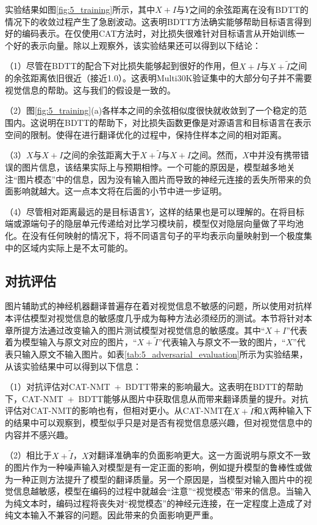 实验结果如图\ref{fig:5_training}所示，其中$X+I$与$Y$之间的余弦距离在没有BDTT的情况下的收敛过程产生了急剧波动。这表明BDTT方法确实能够帮助目标语言得到好的编码表示。在仅使用CAT方法时，对比损失很难针对目标语言从开始训练一个好的表示向量。除以上观察外，该实验结果还可以得到以下结论：

（1）尽管在BDTT的配合下对比损失能够起到很好的作用，但$X+I$与$X+\tilde{I}$之间的余弦距离依旧很近（接近1.0）。这表明Multi30K验证集中的大部分句子并不需要视觉信息的帮助。这与我们的假设是一致的。

（2）图\ref{fig:5_training}(a)各样本之间的余弦相似度很快就收敛到了一个稳定的范围内。这说明在BDTT的帮助下，对比损失函数更像是对源语言和目标语言在表示空间的限制。使得在进行翻译优化的过程中，保持住样本之间的相对距离。

（3）$X$与$X+I$之间的余弦距离大于$X+\tilde{I}$与$X+I$之间。然而，$X$中并没有携带错误的图片信息，该结果实际上与预期相悖。一个可能的原因是，模型越多地关注“图片模态”中的信息，因为没有输入图片而导致的神经元连接的丢失所带来的负面影响就越大。这一点本文将在后面的小节中进一步证明。

（4）尽管相对距离最远的是目标语言$Y$，这样的结果也是可以理解的。在将目标端或源端句子的隐层单元传递给对比学习模块前，模型仅对隐层向量做了平均池化。在没有任何映射的情况下，将不同语言句子的平均表示向量映射到一个极度集中的区域内实际上是不太可能的。

\subsection{对抗评估}
\label{sec:5_adversarial_evaluation}

图片辅助式的神经机器翻译普遍存在着对视觉信息不敏感的问题，所以使用对抗样本评估模型对视觉信息的敏感度几乎成为每种方法必须经历的测试。本节将针对本章所提方法通过改变输入的图片测试模型对视觉信息的敏感度。其中“$X+I$”代表着为模型输入与原文对应的图片，“$X+\tilde{I}$”代表输入与原文不一致的图片，“$X$”代表只输入原文不输入图片。如表\ref{tab:5_adversarial_evaluation}所示为实验结果，从该实验结果中可以得到以下信息：

（1）对抗评估对CAT-NMT~+~BDTT带来的影响最大。这表明在BDTT的帮助下，CAT-NMT~+~BDTT能够从图片中获取信息从而带来翻译质量的提升。对抗评估对CAT-NMT的影响也有，但相对更小。从CAT-NMT在$X+\tilde{I}$和$X$两种输入下的结果中可以观察到，模型似乎只是对是否有视觉信息感兴趣，但对视觉信息中的内容并不感兴趣。

（2）相比于$X+\tilde{I}$，$X$对翻译准确率的负面影响更大。这一方面说明与原文不一致的图片作为一种噪声输入对模型是有一定正面的影响，例如提升模型的鲁棒性或做为一种正则方法提升了模型的翻译质量。另一个原因是，当模型对输入图片中的视觉信息越敏感，模型在编码的过程中就越会“注意”“视觉模态”带来的信息。当输入为纯文本时，编码过程将丧失对“视觉模态”的神经元连接，在一定程度上造成了对纯文本输入不兼容的问题。因此带来的负面影响更严重。

